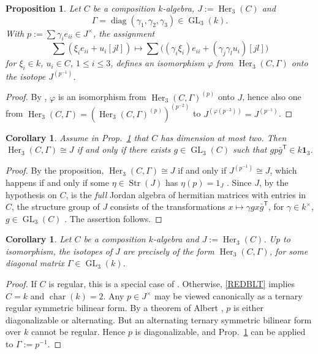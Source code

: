 \documentclass{amsart}
\newtheorem{cor}[equation]{Corollary}
\newtheorem{prop}[equation]{Proposition}
\theoremstyle{definition} %
\theoremstyle{remark} %
\DeclareMathOperator{\Str}{Str}
\DeclareMathOperator{\diag}{diag}
\newcommand{\Eins}{\mathrm{\mathbf{1}}}
\newcommand{\vph}{\varphi}
\newcommand{\trans}{\mathsf{T}}
\DeclareMathOperator{\ch}{char}
\renewcommand{\:}{\colon\,}
\DeclareMathOperator{\Her}{Her}
\DeclareMathOperator{\GL}{GL}
\numberwithin{equation}{section}
\begin{document}
\begin{prop} \label{p.JOMAST}
Let $C$ be a composition $k$-algebra, $J := \Her_3(C)$ and 
\[
\Gamma = \diag(\gamma_1,\gamma_2,\gamma_3) \in \GL_3(k). 
\]
With $p := \sum \gamma_ie_{ii} \in J^\times$, the assignment
\[
\sum(\xi_ie_{ii} + u_i[jl]) \longmapsto \sum\big((\gamma_i\xi_i)e_{ii} + (\gamma_j\gamma_lu_i)[jl]\big)
\]
for $\xi_i \in k$, $u_i \in C$, $1\le i\le 3$, defines an isomorphism $\vph$ from $\Her_3(C,\Gamma)$ onto the isotope $J^{(p^{-1})}$.
\end{prop}

\begin{proof} 
By \cite[Exc.~37.23]{MR4806163}, $\vph$ is an isomorphism from $\Her_3(C,\Gamma)^{(p)}$ onto $J$, hence also one from $\Her_3(C,\Gamma) = (\Her_3(C,\Gamma)^{(p)})^{(p^{-2})}$ to $J^{(\vph(p^{-2}))} = J^{(p^{-1})}$.
\end{proof}

\begin{cor} \label{c.JOMAIS}
Assume in Prop.~\emph{\ref{p.JOMAST}} that $C$ has dimension at most two. Then $\Her_3(C,\Gamma) \cong J$ if and only if  there exists $g \in \GL_3(C)$ such that $g p\bar g^\trans \in k\Eins_3$.
\end{cor}

\begin{proof}
By the proposition, $\Her_3(C,\Gamma) \cong J$ if and only if $J^{(p^{-1})} \cong J$, which happens if and only if some $\eta \in \Str(J)$ has $\eta(p) = 1_J$ \cite[Thm.~31.22~(d)]{MR4806163}. Since $J$, by the hypothesis on $C$, is the \emph{full} Jordan algebra of hermitian matrices with entries in $C$, the structure group of $J$ consists of the transformations $x \mapsto \gamma gx\bar g^\trans$, for $\gamma \in k^\times$, $g \in \GL_3(C)$ \cite[Thms.~6$\--$8]{MR407103}. The assertion follows.
\end{proof}

\begin{cor} \label{c.JOMACL}
Let $C$ be a composition $k$-algebra and $J := \Her_3(C)$. Up to isomorphism, the isotopes of $J$ are precisely of the form $\Her_3(C,\Gamma)$, for some diagonal matrix $\Gamma \in \GL_3(k)$.   
\end{cor}

\begin{proof}
If $C$ is regular, this is a special case of \cite[Thm.~40.10]{MR4806163}. Otherwise, \eqref{REDBLT} implies $C = k$ and $\ch(k) = 2$. Any $p \in J^\times$ may be viewed canonically as a ternary regular symmetric bilinear form. By a theorem of Albert \cite[Thm.~8]{MR1501952}, $p$ is either diagonalizable or alternating. But an alternating ternary symmetric bilinear form over $k$ cannot be regular. Hence $p$ is diagonalizable, and Prop.~\ref{p.JOMAST} can be applied to $\Gamma := p^{-1}$.
\end{proof}
\end{document}
